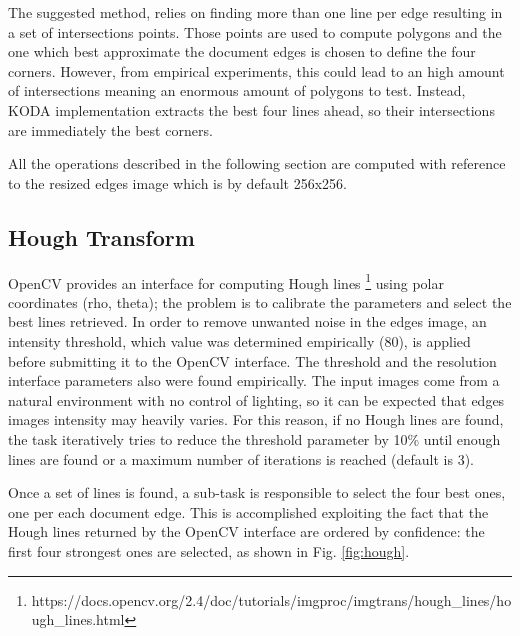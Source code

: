 \documentclass[a4paper]{article}
\begin{document}
The suggested method, relies on finding more than one line per edge resulting in a set of intersections points. Those points are used to compute polygons and the one which best approximate the document edges is chosen to define the four corners. However, from empirical experiments, this could lead to an high amount of intersections meaning an enormous amount of polygons to test. Instead, KODA implementation extracts the best four lines ahead, so their intersections are immediately the best corners.

All the operations described in the following section are computed with reference to the resized edges image which is by default 256x256.

\subsection{Hough Transform}

OpenCV provides an interface for computing Hough lines \footnote{https://docs.opencv.org/2.4/doc/tutorials/imgproc/imgtrans/hough\_lines/hough\_lines.html} using polar coordinates (rho, theta); the problem is to calibrate the parameters and select the best lines retrieved. In order to remove unwanted noise in the edges image, an intensity threshold, which value was determined empirically (80), is applied before submitting it to the OpenCV interface. The threshold and the resolution interface parameters also were found empirically. The input images come from a natural environment with no control of lighting, so it can be expected that edges images intensity may heavily varies. For this reason, if no Hough lines are found, the task iteratively tries to reduce the threshold parameter by 10\% until enough lines are found or a maximum number of iterations is reached (default is 3). 

Once a set of lines is found, a sub-task is responsible to select the four best ones, one per each document edge. This is accomplished exploiting the fact that the Hough lines returned by the OpenCV interface are ordered by confidence: the first four strongest ones are selected, as shown in Fig. \ref{fig:hough}.
\end{document}
